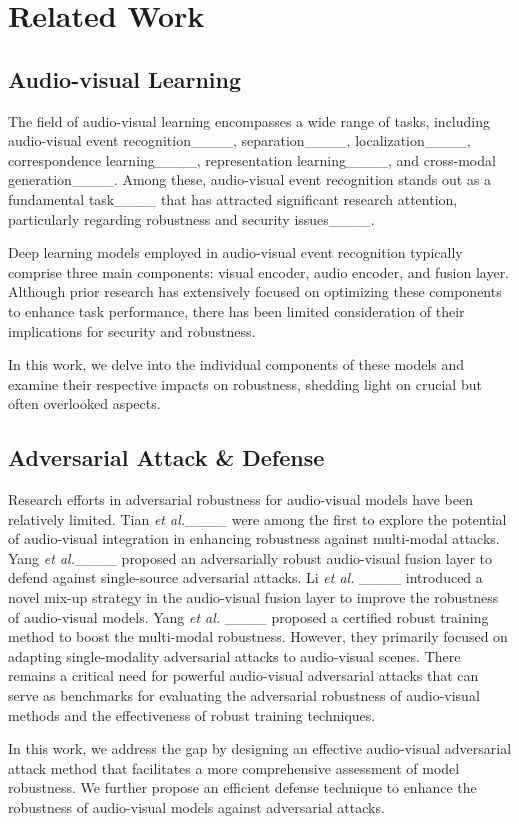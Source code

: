 \section{Related Work}
\subsection{Audio-visual Learning}
The field of audio-visual learning encompasses a wide range of tasks, including audio-visual event recognition____, separation____, localization____, correspondence learning____, representation learning____, and cross-modal generation____. Among these, audio-visual event recognition stands out as a fundamental task____ that has attracted significant research attention, particularly regarding robustness and security issues____.

Deep learning models employed in audio-visual event recognition typically comprise three main components: visual encoder, audio encoder, and fusion layer. Although prior research has extensively focused on optimizing these components to enhance task performance, there has been limited consideration of their implications for security and robustness. 

In this work, we delve into the individual components of these models and examine their respective impacts on robustness, shedding light on crucial but often overlooked aspects.





\subsection{Adversarial Attack \& Defense}




Research efforts in adversarial robustness for audio-visual models have been relatively limited. Tian \textit{et al.}____ were among the first to explore the potential of audio-visual integration in enhancing robustness against multi-modal attacks. Yang \textit{et al.}____ proposed an adversarially robust audio-visual fusion layer to defend against single-source adversarial attacks. Li \textit{et al.} ____ introduced a novel mix-up strategy in the audio-visual fusion layer to improve the robustness of audio-visual models. Yang \textit{et al.} ____ proposed a certified robust training method to boost the multi-modal robustness. 
However, they primarily focused on adapting single-modality adversarial attacks to audio-visual scenes. There remains a critical need for powerful audio-visual adversarial attacks that can serve as benchmarks for evaluating the adversarial robustness of audio-visual methods and the effectiveness of robust training techniques.

In this work, we address the gap by designing an effective audio-visual adversarial attack method that facilitates a more comprehensive assessment of model robustness. We further propose an efficient defense technique to enhance the robustness of audio-visual models against adversarial attacks.